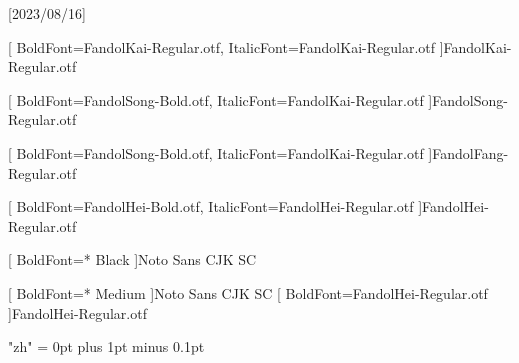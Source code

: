 [2023/08/16]






[
    BoldFont=FandolKai-Regular.otf, ItalicFont=FandolKai-Regular.otf
]{FandolKai-Regular.otf}

[
    BoldFont=FandolSong-Bold.otf,
    ItalicFont=FandolKai-Regular.otf
]{FandolSong-Regular.otf}

[
    BoldFont=FandolSong-Bold.otf,
    ItalicFont=FandolKai-Regular.otf
]{FandolFang-Regular.otf}

[
    BoldFont=FandolHei-Bold.otf,
    ItalicFont=FandolHei-Regular.otf
]{FandolHei-Regular.otf}


[
    BoldFont=* Black
]{Noto Sans CJK SC}

[
    BoldFont=* Medium
]{Noto Sans CJK SC}	%
[
    BoldFont=FandolHei-Regular.otf
]{FandolHei-Regular.otf}	%

\XeTeXlinebreaklocale "zh"
\XeTeXlinebreakskip = 0pt plus 1pt minus 0.1pt

\newcommand\kaishu{\CJKfamily{kai}} %
\newcommand\songti{\CJKfamily{song}} %
\newcommand\heiti{\CJKfamily{hei}}	%
\newcommand\thmheiti{\CJKfamily{hei2}}	%
\newcommand\fangsong{\CJKfamily{fangsong}} %
\renewcommand{\em}{\bfseries\CJKfamily{emfont}} %